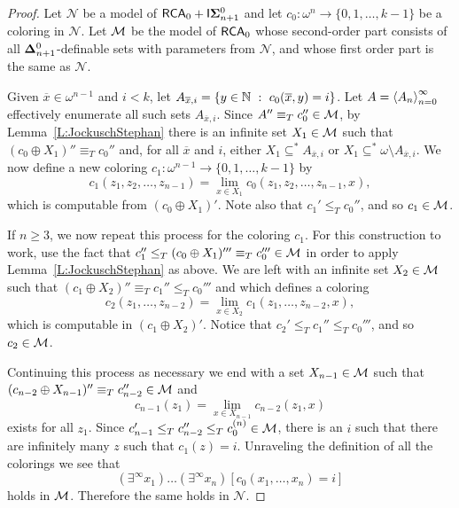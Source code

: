 \begin{proof}
Let $\mathcal{N}$ be a model of $\mathsf{RCA}_0 + \mathsf{I}{\mathbf{\Sigma}^0_{n+1}}$ and let
$c_0:\omega^n\to\{0,1,\dots,k-1\}$ be a coloring in $\mathcal{N}$.
Let $\mathcal{M}$ be the model of $\mathsf{RCA}_0$ whose second-order part consists of all
$\mathbf{\Delta}^0_{n+1}$-definable sets with parameters from $\mathcal{N}$,
and whose first order part is the same as $\mathcal{N}$.

Given $\overline{x}\in\omega^{n-1}$ and $i<k$, let
$A_{\overline{x},i}=\left\{y\in\mathbb{N}\ :\ c_0(\overline{x},y)=i\right\}$.
Let $A=\left\langle A_n\right\rangle_{n=0}^\infty$ effectively enumerate all such sets $A_{\overline{x},i}$.
Since $A'' \equiv_T c_0'' \in\mathcal{M}$, by
Lemma~\ref{L:JockuschStephan} there is an infinite set $X_1\in\mathcal{M}$ such
that $(c_0 \oplus X_1)'' \equiv_T c_0''$ and, for all $\overline{x}$ and $i$,
either $X_1\subseteq^* A_{\overline{x},i}$ or
$X_1\subseteq^*\omega\setminus A_{\overline{x},i}$.
We now define a new coloring $c_1:\omega^{n-1}\to\{0,1,\ldots, k-1\}$ by
$$c_1(z_1,z_2,\ldots,z_{n-1}) = \lim_{x \in X_1} c_0(z_1,z_2,\ldots,z_{n-1},x),$$
which is computable from $(c_0 \oplus X_1)'$.
Note also that $c_1'\leq_T c_0''$, and so $c_1\in\mathcal{M}$.

If $n \geq 3$, we now repeat this process for the coloring $c_1$.
For this construction to work, use the fact that $c_1'' \leq_T (c_0
\oplus X_1)''' \equiv_T c_0''' \in\mathcal{M}$ in order to apply
Lemma~\ref{L:JockuschStephan} as above.  We are left with an
infinite set $X_2\in\mathcal{M}$ such that $(c_1 \oplus X_2)'' \equiv_T c_1''
\leq_T c_0'''$ and which defines a coloring
$$c_2(z_1,\ldots,z_{n-2}) = \lim_{x \in X_2} c_1(z_1,\ldots,z_{n-2},x),$$
which is computable in $(c_1 \oplus X_2)'$.
Notice that $c_2'\leq_T c_1''\leq_T c_0'''$, and so $c_2\in\mathcal{M}$.

Continuing this process as necessary we end with a set $X_{n-1}\in\mathcal{M}$
such that $(c_{n-2} \oplus X_{n-1})'' \equiv_T c_{n-2}'' \in \mathcal{M}$ and
$$c_{n-1}(z_1) = \lim_{x\in X_{n-1}} c_{n-2}(z_1,x)$$
exists for all $z_1$.
Since $c_{n-1}' \leq_T c_{n-2}'' \leq_T c_0^{(n)} \in \mathcal{M}$,
there is an $i$ such that there are infinitely many $z$ such that $c_1(z) = i$.
Unraveling the definition of all the colorings we see that
$$(\exists^\infty x_1)\ldots(\exists^\infty x_n)[c_0(x_1,\dots,x_n)=i]$$
holds in $\mathcal{M}$.
Therefore the same holds in $\mathcal{N}$.
\end{proof}
